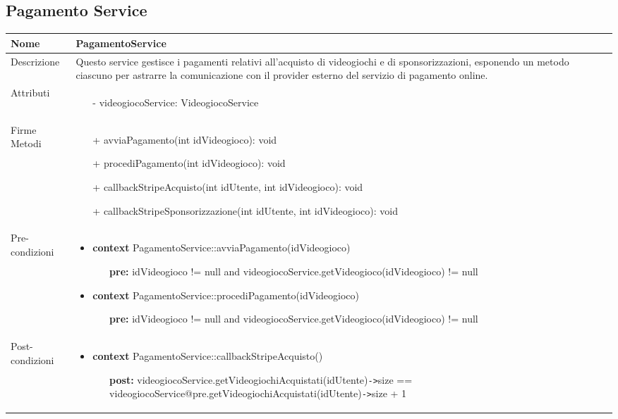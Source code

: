 \newpage
\subsection{Pagamento Service}
\small\begin{tabular}{|| l | p{28em} ||} 
	\hline
	Nome & PagamentoService\\
	\hline
	Descrizione & Questo service gestisce i pagamenti relativi all'acquisto di videogiochi e di sponsorizzazioni, esponendo un metodo ciascuno per astrarre la comunicazione con il provider esterno del servizio di pagamento online. \\
	\hline
	Attributi & \begin{itemize}
		\item[-] videogiocoService: VideogiocoService
	\end{itemize}\\
	\hline
	Firme Metodi & \begin{itemize}
		\item[+] avviaPagamento(int idVideogioco): void 
		\item[+] procediPagamento(int idVideogioco): void
		\item[+] callbackStripeAcquisto(int idUtente, int idVideogioco): void  
		\item[+] callbackStripeSponsorizzazione(int idUtente, int idVideogioco): void
	\end{itemize}\\
	\hline
	Pre-condizioni & \begin{itemize}[leftmargin=*]
		\item \textbf{context} PagamentoService::avviaPagamento(idVideogioco)
		\begin{itemize}
			\item[ ] \textbf{pre:} idVideogioco != null and videogiocoService.getVideogioco(idVideogioco) != null
		\end{itemize}

		\item \textbf{context} PagamentoService::procediPagamento(idVideogioco)
		\begin{itemize}
			\item[ ] \textbf{pre:} idVideogioco != null and videogiocoService.getVideogioco(idVideogioco) != null
		\end{itemize}
	\end{itemize}\\
	\hline
	Post-condizioni & \begin{itemize}[leftmargin=*]
		\item \textbf{context} PagamentoService::callbackStripeAcquisto()
		\begin{itemize}
			\item[ ] \textbf{post:} videogiocoService.getVideogiochiAcquistati(idUtente)\verb|->|size == videogiocoService@pre.getVideogiochiAcquistati(idUtente)\verb|->|size + 1
		\end{itemize}


\end{itemize}
\end{tabular}
